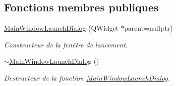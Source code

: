 \subsection*{Fonctions membres publiques}
\begin{DoxyCompactItemize}
\item 
\hyperlink{classMainWindowLaunchDialog_a9f7ef6d5da5eff43adb6ea835f0790d0}{Main\+Window\+Launch\+Dialog} (Q\+Widget $\ast$parent=nullptr)
\begin{DoxyCompactList}\small\item\em Constructeur de la fenêtre de lancement. \end{DoxyCompactList}\item 
\hyperlink{classMainWindowLaunchDialog_abf8a63fe899ba6d8fcbdf179122dfcb7}{$\sim$\+Main\+Window\+Launch\+Dialog} ()
\begin{DoxyCompactList}\small\item\em Destructeur de la fonction \hyperlink{classMainWindowLaunchDialog}{Main\+Window\+Launch\+Dialog}. \end{DoxyCompactList}\end{DoxyCompactItemize}
